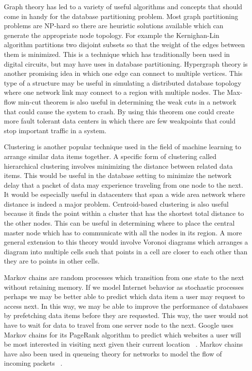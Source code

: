\documentclass[10pt,final,journal]{IEEEtran}
\begin{document}
Graph theory has led to a variety of useful algorithms and concepts that should come in handy for the database partitioning problem.  Most graph partitioning problems are NP-hard so there are heuristic solutions available which can generate the appropriate node topology.  For example the Kernighan-Lin algorithm partitions two disjoint subsets so that the weight of the edges between them is minimized.  This is a technique which has traditionally been used in digital circuits, but may have uses in database partitioning.  Hypergraph theory is another promising idea in which one edge can connect to multiple vertices.  This type of a structure may be useful in simulating a distributed database topology where one network link may connect to a region with multiple nodes.  The Max-flow min-cut theorem is also useful in determining the weak cuts in a network that could cause the system to crash.  By using this theorem one could create more fault tolerant data centers in which there are few weakpoints that could stop important traffic in a system.

Clustering is another popular technique used in the field of machine learning to arrange similar data items together.  A specific form of clustering called hierarchical clustering involves minimizing the distance between related data items.  This would be useful in the database setting to minimize the network delay that a packet of data may experience traveling from one node to the next.  It would be especially useful in datacenters that span a wide area network where distance is indeed a major problem.  Centroid-based clustering is also useful because it finds the point within a cluster that has the shortest total distance to the other nodes.  This can be useful in determining where to place the central master node which has to communicate with all the nodes in its region.  A more general extension to this theory would involve Voronoi diagrams which arranges a diagram into multiple cells such that points in a cell are closer to each other than they are to points in other cells.

Markov chains are random processes which transition from one state to the next without retaining memory.  If we model Internet behavior as stochastic processes perhaps we may be better able to predict which data item a user may request to access next.  In this way, we may be able to improve the performance of databases by prefetching data items before they are requested.  This way, the user would not have to wait for data to travel from one server node to the next.  Google uses Markov chains for its PageRank algorithm to predict which websites a user will be most interested in visiting next given their current location ~\cite{Page_1998}.  Markov chains have also been used in queueing theory for networks to model the flow of incoming packets ~\cite{Bose02}.
\end{document}
